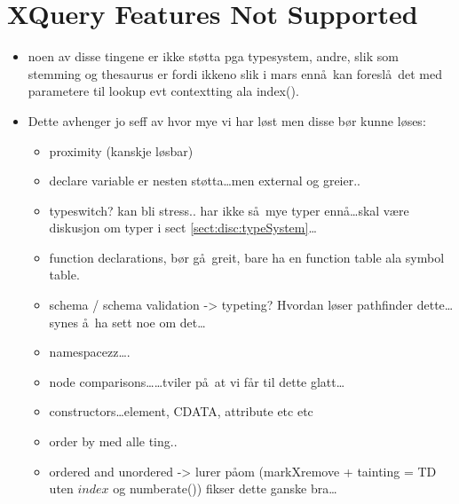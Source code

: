 \section{XQuery Features Not Supported}
\label{sect:discussion:notSupported}
\begin{itemize}
\item noen av disse tingene er ikke st\o tta pga typesystem, andre, slik som stemming og thesaurus er fordi ikkeno
slik i mars enn\aa~kan foresl\aa~det med parametere til lookup evt contextting ala \textsf{index()}.
  \item Dette avhenger jo seff av hvor mye vi har l\o st men disse b\o r kunne
  l\o ses:
  	\begin{itemize}
  		\item proximity (kanskje l\o sbar)
  		\item declare variable er nesten st\o tta\ldots men external og greier..
  		\item typeswitch? kan bli stress.. har ikke s\aa~mye typer enn\aa \ldots skal v\ae re diskusjon om typer i
  		sect \ref{sect:disc:typeSystem}\ldots
  		\item function declarations, b\o r g\aa~greit, bare ha en function table ala symbol table.
  		\item schema / schema validation -> typeting? Hvordan l\o ser pathfinder dette\ldots synes \aa~ha sett noe om
  		det\ldots
  		\item namespacezz\ldots.
  		\item node comparisons\ldots\ldots tviler p\aa~at vi f\aa r til dette glatt\ldots
  		\item constructors\ldots element, CDATA, attribute etc etc
  		\item order by med alle ting..
  		\item ordered and unordered -> lurer p\aa om (markXremove + tainting = TD uten $index$ og
  		\textsf{numberate()}) fikser dette ganske bra\ldots
  		\end{itemize}
	\end{itemize}
